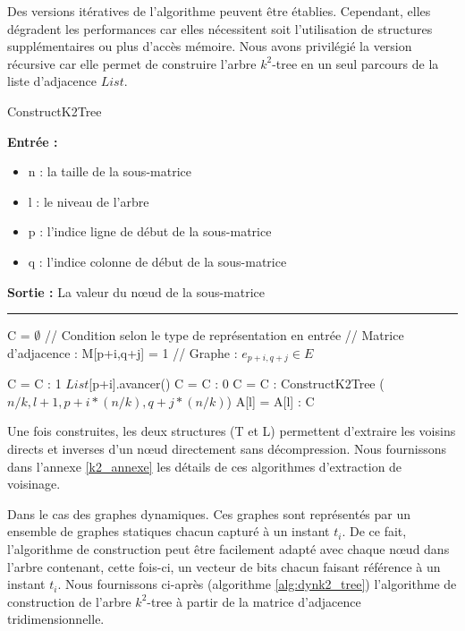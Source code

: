 \documentclass[a4paper,oneside,12pt]{report}
\theoremstyle{definition}
\begin{document}
Des versions itératives de l'algorithme peuvent être établies. Cependant, elles dégradent les performances car elles nécessitent soit l'utilisation de structures supplémentaires ou plus d'accès mémoire. Nous avons privilégié la version récursive car elle permet de construire l'arbre $k^2$-tree en un seul parcours de la liste d'adjacence $List$.\\

					\begin{algorithm}[H]
					\label{alg:k2_tree}
					\caption{ConstructK2Tree}
					\textbf{Entrée :}
						\begin{itemize}[label=$\bullet$]
							\item n : la taille de la sous-matrice
							\item l : le niveau de l'arbre
							\item p : l'indice ligne de début de la sous-matrice
							\item q : l'indice colonne de début de la sous-matrice
						\end{itemize}
					\textbf{Sortie :} La valeur du nœud de la sous-matrice\\							\noindent\rule{\textwidth}{1pt}
						
						
				\begin{algorithmic} [1]
					\STATE C = $ \emptyset$
								\STATE // Condition selon le type de représentation en entrée 
								\STATE // Matrice d'adjacence : M[p+i,q+j] = 1 
								\STATE // Graphe : $e_{p+i,q+j} \in E$
								
									\STATE C = C : 1
									\STATE $List$[p+i].avancer()
								\ELSE
									\STATE C = C : 0
								\ENDIF
							\ELSE
								\STATE  C = C : ConstructK2Tree ( $n/k,l+1,p+i*(n/k), q+j*(n/k)$)
							\ENDIF
						\ENDFOR
					\ENDFOR
					\ENDIF
					\STATE A[l] = A[l] : C
				\end{algorithmic}
			\end{algorithm}
	
	
		Une fois construites, les deux structures (T et L) permettent d'extraire les voisins directs et inverses d'un nœud directement sans décompression. Nous fournissons dans l'annexe \ref{k2_annexe} les détails de ces  algorithmes d'extraction de voisinage.		
			
	

	Dans le cas des graphes dynamiques. Ces graphes sont représentés par un ensemble de graphes statiques chacun capturé à un instant $t_i$. De ce fait, l'algorithme de construction peut être facilement adapté avec chaque nœud dans l'arbre contenant, cette fois-ci, un vecteur de bits chacun faisant référence à un instant $t_i$. Nous fournissons ci-après (algorithme \ref{alg:dynk2_tree}) l'algorithme de construction de l'arbre $k^2$-tree à partir de la matrice d'adjacence tridimensionnelle.\\
	
\end{document}
